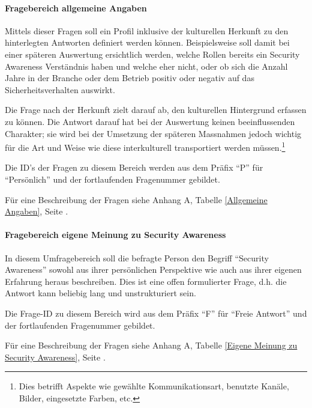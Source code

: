 \documentclass[../../main.tex]{subfiles}
\begin{document}
\paragraph*{Fragebereich allgemeine Angaben}\mbox{}

\begin{sloppypar}
Mittels dieser Fragen soll ein Profil inklusive der kulturellen Herkunft zu den hinterlegten Antworten definiert werden können. Beispielsweise soll damit bei einer späteren Auswertung ersichtlich werden, welche Rollen bereits ein Security Awareness Verständnis haben und welche eher nicht, oder ob sich die Anzahl Jahre in der Branche oder dem Betrieb positiv oder negativ auf das Sicherheitsverhalten auswirkt.

Die Frage nach der Herkunft zielt darauf ab, den kulturellen Hintergrund erfassen zu können. Die Antwort darauf hat bei der Auswertung keinen beeinflussenden Charakter; sie wird bei der Umsetzung der späteren Massnahmen jedoch wichtig für die Art und Weise wie diese interkulturell transportiert werden müssen.\footnote {Dies betrifft Aspekte wie gewählte Kommunikationsart, benutzte Kanäle, Bilder, eingesetzte Farben, etc.}

Die ID's der Fragen zu diesem Bereich werden aus dem Präfix "`P"' für "`Persönlich"' und der fortlaufenden Fragenummer gebildet.

Für eine Beschreibung der Fragen siehe Anhang A, Tabelle \ref{Allgemeine Angaben}, Seite \pageref{Allgemeine Angaben}.
\end{sloppypar}

\paragraph*{Fragebereich eigene Meinung zu Security Awareness}\mbox{}

\begin{sloppypar}
In diesem Umfragebereich soll die befragte Person den Begriff "`Security Awareness"' sowohl aus ihrer persönlichen Perspektive wie auch aus ihrer eigenen Erfahrung heraus beschreiben. Dies ist eine offen formulierter Frage, d.h. die Antwort kann beliebig lang und unstrukturiert sein.

Die Frage-ID zu diesem Bereich wird aus dem Präfix "`F"' für "`Freie Antwort"' und der fortlaufenden Fragenummer gebildet.

Für eine Beschreibung der Fragen siehe Anhang A, Tabelle \ref{Eigene Meinung zu Security Awareness}, Seite \pageref{Eigene Meinung zu Security Awareness}.
\end{sloppypar}
\end{document}

